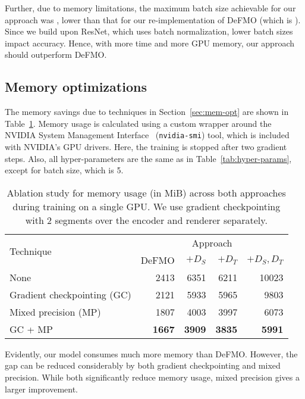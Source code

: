     Further, due to memory limitations, the maximum batch size achievable for our approach was \oursbatchsize, lower than that for our re-implementation of DeFMO (which is ).
    Since we build upon ResNet, which uses batch normalization, lower batch sizes impact accuracy.
    Hence, with more time and more GPU memory, our approach should outperform DeFMO.\@

\subsection{Memory optimizations}
    The memory savings due to techniques in Section~\ref{sec:mem-opt} are shown in Table~\ref{tab:mem-opt}.
    Memory usage is calculated using a custom wrapper around the NVIDIA System Management Interface~\citep{nvidia-smi} (\texttt{nvidia-smi}) tool, which is included with NVIDIA's GPU drivers.
    Here, the training is stopped after two gradient steps.
    Also, all hyper-parameters are the same as in Table~\ref{tab:hyper-params}, except for batch size, which is 5.

    \begin{table}
        \caption{
            Ablation study for memory usage (in MiB) across both approaches during training on a single GPU.\@
            We use gradient checkpointing with 2 segments over the encoder and renderer separately.
        }%
        \label{tab:mem-opt}
        \begin{tabular}{lrrrr}
            \toprule
            \multirow{2}[2]{*}{Technique} & \multicolumn{4}{c}{Approach}\\
            \cmidrule(lr){2-5}
            & DeFMO & $+ D_S$ & $+ D_T$ & $+ D_S, D_T$\\
            \midrule
            None & 2413 & 6351 & 6211 & 10023\\
            Gradient checkpointing (GC) & 2121 & 5933 & 5965 & 9803\\
            Mixed precision (MP) & 1807 & 4003 & 3997 & 6073\\
            GC + MP & \textbf{1667} & \textbf{3909} & \textbf{3835} & \textbf{5991}\\
            \bottomrule
        \end{tabular}
        \centering
    \end{table}

    Evidently, our model consumes much more memory than DeFMO.\@
    However, the gap can be reduced considerably by both gradient checkpointing and mixed precision.
    While both significantly reduce memory usage, mixed precision gives a larger improvement.

